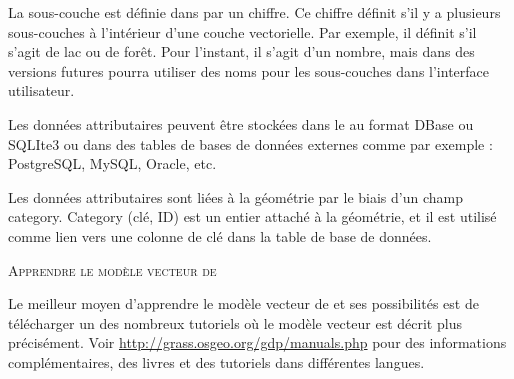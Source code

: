 {%
La sous-couche est définie dans \grass par un chiffre. Ce chiffre définit s'il y a plusieurs sous-couches à l'intérieur d'une couche vectorielle. Par exemple, il définit s'il s'agit de lac ou de forêt. Pour l'instant, il s'agit d'un nombre, mais dans des versions futures \grass pourra utiliser des noms pour les sous-couches dans l'interface utilisateur.

Les données attributaires peuvent être stockées dans le  au format DBase ou SQLIte3 ou dans des tables de bases de données externes comme par exemple : PostgreSQL, MySQL, Oracle, etc.

Les données attributaires sont liées à la géométrie par le biais d'un champ category. Category (clé, ID) est un entier attaché à la géométrie, et il est utilisé comme lien vers une colonne de clé dans la table de base de données.

\begin{Tip}\caption{\textsc{Apprendre le modèle vecteur de \grass}}
Le meilleur moyen d'apprendre le modèle vecteur de \grass et ses possibilités est de télécharger un des nombreux tutoriels \grass où le modèle vecteur est décrit plus précisément. Voir \url{http://grass.osgeo.org/gdp/manuals.php} pour des informations complémentaires, des livres et des tutoriels dans différentes langues.
\end{Tip} 

}
